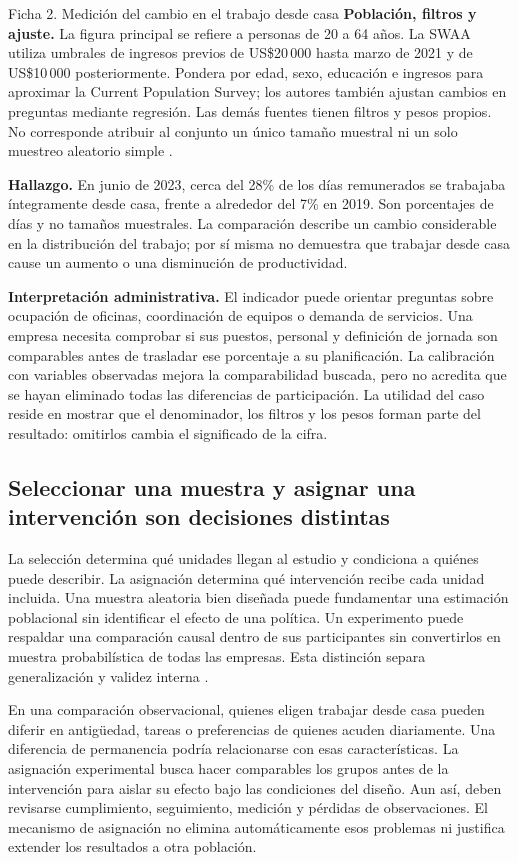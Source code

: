{\begin{fichainvestigacion}{Ficha 2. Medición del cambio en el trabajo desde casa}
\textbf{Población, filtros y ajuste.} La figura principal se refiere a personas de 20 a 64 años. La SWAA utiliza umbrales de ingresos previos de US\$20\,000 hasta marzo de 2021 y de US\$10\,000 posteriormente. Pondera por edad, sexo, educación e ingresos para aproximar la Current Population Survey; los autores también ajustan cambios en preguntas mediante regresión. Las demás fuentes tienen filtros y pesos propios. No corresponde atribuir al conjunto un único tamaño muestral ni un solo muestreo aleatorio simple \citep[figura~1 y notas]{barrero2023}.

\textbf{Hallazgo.} En junio de 2023, cerca del 28\% de los días remunerados se trabajaba íntegramente desde casa, frente a alrededor del 7\% en 2019. Son porcentajes de días y no tamaños muestrales. La comparación describe un cambio considerable en la distribución del trabajo; por sí misma no demuestra que trabajar desde casa cause un aumento o una disminución de productividad.

\textbf{Interpretación administrativa.} El indicador puede orientar preguntas sobre ocupación de oficinas, coordinación de equipos o demanda de servicios. Una empresa necesita comprobar si sus puestos, personal y definición de jornada son comparables antes de trasladar ese porcentaje a su planificación. La calibración con variables observadas mejora la comparabilidad buscada, pero no acredita que se hayan eliminado todas las diferencias de participación. La utilidad del caso reside en mostrar que el denominador, los filtros y los pesos forman parte del resultado: omitirlos cambia el significado de la cifra.
\end{fichainvestigacion}

\subsection{Seleccionar una muestra y asignar una intervención son decisiones distintas}
La selección determina qué unidades llegan al estudio y condiciona a quiénes puede describir. La asignación determina qué intervención recibe cada unidad incluida. Una muestra aleatoria bien diseñada puede fundamentar una estimación poblacional sin identificar el efecto de una política. Un experimento puede respaldar una comparación causal dentro de sus participantes sin convertirlos en muestra probabilística de todas las empresas. Esta distinción separa generalización y validez interna \citep{holmesBusiness2023,bloom2024}.

En una comparación observacional, quienes eligen trabajar desde casa pueden diferir en antigüedad, tareas o preferencias de quienes acuden diariamente. Una diferencia de permanencia podría relacionarse con esas características. La asignación experimental busca hacer comparables los grupos antes de la intervención para aislar su efecto bajo las condiciones del diseño. Aun así, deben revisarse cumplimiento, seguimiento, medición y pérdidas de observaciones. El mecanismo de asignación no elimina automáticamente esos problemas ni justifica extender los resultados a otra población.

}
